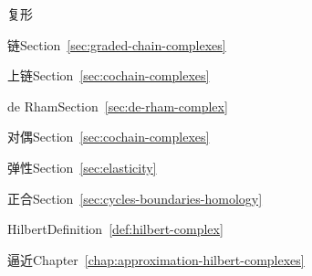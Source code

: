 \par\noindent\hspace*{0em}\label{index:complex}{复形}

\par\noindent\hspace*{1em}\label{index:complex-chain}{链}\quad Section~\ref{sec:graded-chain-complexes}

\par\noindent\hspace*{1em}\label{index:complex-cochain}{上链}\quad Section~\ref{sec:cochain-complexes}

\par\noindent\hspace*{1em}\label{index:complex-de-rham}{de Rham}\quad Section~\ref{sec:de-rham-complex}

\par\noindent\hspace*{1em}\label{index:complex-dual}{对偶}\quad Section~\ref{sec:cochain-complexes}

\par\noindent\hspace*{1em}\label{index:complex-elasticity}{弹性}\quad Section~\ref{sec:elasticity}

\par\noindent\hspace*{1em}\label{index:complex-exact}{正合}\quad Section~\ref{sec:cycles-boundaries-homology}

\par\noindent\hspace*{1em}\label{index:complex-hilbert}{Hilbert}\quad Definition~\ref{def:hilbert-complex}

\par\noindent\hspace*{2em}\label{index:complex-hilbert-approximation-of}{逼近}\quad Chapter~\ref{chap:approximation-hilbert-complexes}

